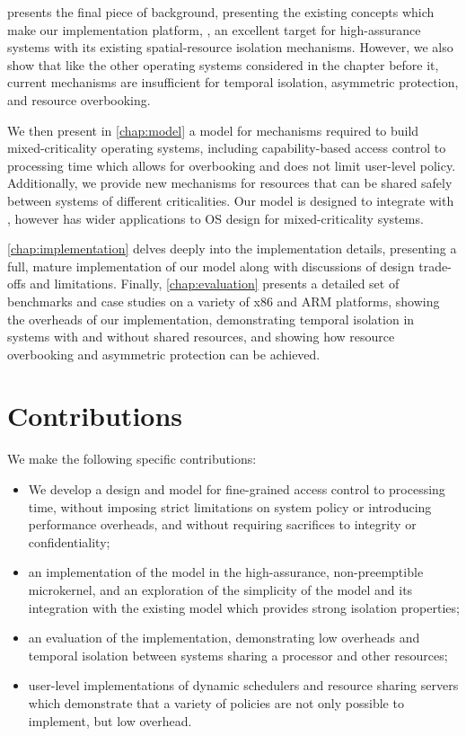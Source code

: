  presents the final piece of background, presenting the existing concepts which make
our implementation platform, \selfour, an excellent target for high-assurance systems with its
existing spatial-resource isolation mechanisms. However, we also show that like the other operating
systems considered in the chapter before it, current mechanisms are insufficient for temporal
isolation, asymmetric protection, and resource overbooking. 

We then present in \cref{chap:model} a model for mechanisms required to build mixed-criticality operating systems,
including capability-based access control to processing time which allows for overbooking and does
not limit user-level policy. Additionally, we provide new mechanisms for resources that can be
shared safely between systems of different criticalities. Our model is designed to integrate with
\selfour, however has wider applications to \gls{OS} design for mixed-criticality systems.

\cref{chap:implementation} delves deeply into the implementation details, presenting a full, mature
implementation of our model along with discussions of design trade-offs and limitations. Finally,
\cref{chap:evaluation} presents a detailed set of benchmarks and case studies on a variety of x86
and ARM platforms, showing the overheads
of our implementation, demonstrating temporal isolation in systems with and without shared
resources, and showing how resource overbooking and asymmetric protection can be achieved.

\section{Contributions}

We make the following specific contributions:

\begin{itemize}
    \item We develop a design and model for fine-grained access control to processing time, without
        imposing strict limitations on system policy or introducing performance overheads, and
        without requiring sacrifices to integrity or confidentiality;
    \item an implementation of the model in the high-assurance, non-preemptible \selfour microkernel,
        and an exploration of the simplicity of the model and its integration with the existing
        model which provides strong isolation properties;
    \item an evaluation of the implementation, demonstrating low overheads and temporal isolation
        between systems sharing a processor and other resources;
    \item user-level implementations of dynamic schedulers and resource sharing servers which
        demonstrate that a variety of policies are not only possible to implement, but low overhead.
\end{itemize}

